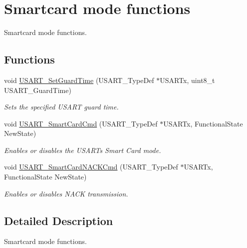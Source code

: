 \hypertarget{group___u_s_a_r_t___group6}{}\section{Smartcard mode functions}
\label{group___u_s_a_r_t___group6}


Smartcard mode functions.  


\subsection*{Functions}
\begin{DoxyCompactItemize}
\item 
void \mbox{\hyperlink{group___u_s_a_r_t___group6_gac4a35c6acd71ae7e0d67c1f03f0a8777}{U\+S\+A\+R\+T\+\_\+\+Set\+Guard\+Time}} (U\+S\+A\+R\+T\+\_\+\+Type\+Def $\ast$U\+S\+A\+R\+Tx, uint8\+\_\+t U\+S\+A\+R\+T\+\_\+\+Guard\+Time)
\begin{DoxyCompactList}\small\item\em Sets the specified U\+S\+A\+RT guard time. \end{DoxyCompactList}\item 
void \mbox{\hyperlink{group___u_s_a_r_t___group6_gabd1347e244c623447151ba3a5e986c5f}{U\+S\+A\+R\+T\+\_\+\+Smart\+Card\+Cmd}} (U\+S\+A\+R\+T\+\_\+\+Type\+Def $\ast$U\+S\+A\+R\+Tx, Functional\+State New\+State)
\begin{DoxyCompactList}\small\item\em Enables or disables the U\+S\+A\+RT\textquotesingle{}s Smart Card mode. \end{DoxyCompactList}\item 
void \mbox{\hyperlink{group___u_s_a_r_t___group6_ga62e22f47e38aa53f2edce8771f7a5dfa}{U\+S\+A\+R\+T\+\_\+\+Smart\+Card\+N\+A\+C\+K\+Cmd}} (U\+S\+A\+R\+T\+\_\+\+Type\+Def $\ast$U\+S\+A\+R\+Tx, Functional\+State New\+State)
\begin{DoxyCompactList}\small\item\em Enables or disables N\+A\+CK transmission. \end{DoxyCompactList}\end{DoxyCompactItemize}


\subsection{Detailed Description}
Smartcard mode functions. 

